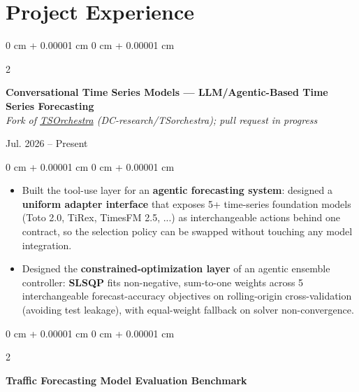 \documentclass[10pt, letterpaper]{article}
\newenvironment{onecolentry}{
    \begin{adjustwidth}{
        0 cm + 0.00001 cm
    }{
        0 cm + 0.00001 cm
    }
}{
    \end{adjustwidth}
} %
\newenvironment{twocolentry}[2][]{
    \onecolentry
    \def\secondColumn{#2}
    \setcolumnwidth{\fill, 4.5 cm}
    \begin{paracol}{2}
}{
    \switchcolumn \raggedleft \secondColumn
    \end{paracol}
    \endonecolentry
} %
\begin{document}


    \section{Project Experience}
         \begin{twocolentry}{
            \hfill Jul. 2026 -- Present
        }
            \textbf{Conversational Time Series Models --- LLM/Agentic-Based Time Series Forecasting} 
            \href{https://github.com/tliao730/TSorchestra}{\faGithub}
            \\ \textit{\small Fork of \href{https://github.com/DC-research/TSorchestra}{TSOrchestra} (DC-research/TSorchestra); pull request in progress}

        \end{twocolentry}

        \vspace{0.10 cm}
        \begin{onecolentry}
            \begin{itemize}
            
                \item Built the tool-use layer for an \textbf{agentic forecasting system}: designed a \textbf{uniform adapter interface} that exposes 5+ time-series foundation models (Toto 2.0, TiRex, TimesFM 2.5, ...) as interchangeable actions behind one contract, so the selection policy can be swapped without touching any model integration.

                \item Designed the \textbf{constrained-optimization layer} of an agentic ensemble controller: \textbf{SLSQP} fits non-negative, sum-to-one weights across 5 interchangeable forecast-accuracy objectives on rolling-origin cross-validation (avoiding test leakage), with equal-weight fallback on solver non-convergence.
                
                
            \end{itemize}
        \end{onecolentry}
        \begin{twocolentry}{
    
        }
            \textbf{Traffic Forecasting Model Evaluation Benchmark}
            \href{https://github.com/DC-research/TrafficFM/tree/tbench}{\faGithub}
            \end{twocolentry}
\end{document}
